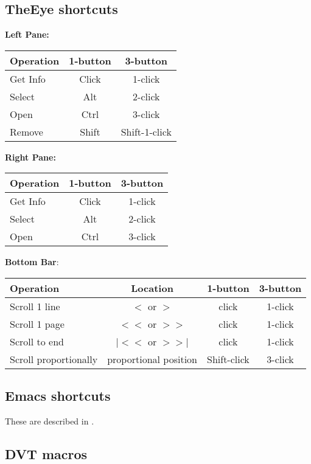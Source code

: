 \documentclass[12pt]{article}
\begin{document}
\subsection{TheEye shortcuts}
\label{sec:shorteye}
\textbf{Left Pane:}\nopagebreak

\begin{tabular}{|l|c|c|}
  \hline
  Operation & 1-button & 3-button \\
  \hline
  Get Info & Click & 1-click \\
  Select & Alt & 2-click \\
  Open  & Ctrl & 3-click \\
  Remove  & Shift & Shift-1-click \\
  \hline
\end{tabular}
\bigskip


\textbf{Right Pane:}\nopagebreak

\begin{tabular}{|l|c|c|}
  \hline
  Operation & 1-button & 3-button \\
  \hline
  Get Info & Click & 1-click \\
  Select & Alt & 2-click \\
  Open & Ctrl & 3-click \\
  \hline
\end{tabular}
\bigskip

\textbf{Bottom Bar}:\nopagebreak

\begin{tabular}{|l|c|c|c|}
  \hline
  Operation & Location & 1-button & 3-button \\
  \hline
  Scroll 1 line & $<$ or $>$ & click & 1-click \\
  Scroll 1 page & $<\!\!<$ or $>\!\!>$ & click & 1-click \\
  Scroll to end & $|\!\!\!<\!\!<$ or $>\!\!>\!\!\!|$ & click & 1-click \\
  Scroll proportionally & proportional position & Shift-click &
  3-click \\
  \hline
\end{tabular}
\bigskip

\subsection{Emacs shortcuts}
\label{sec:shortemacs}

These are described in \citet{dvt-emacs}.


\subsection{DVT macros}
\label{sec:shortmacro}
\end{document}
